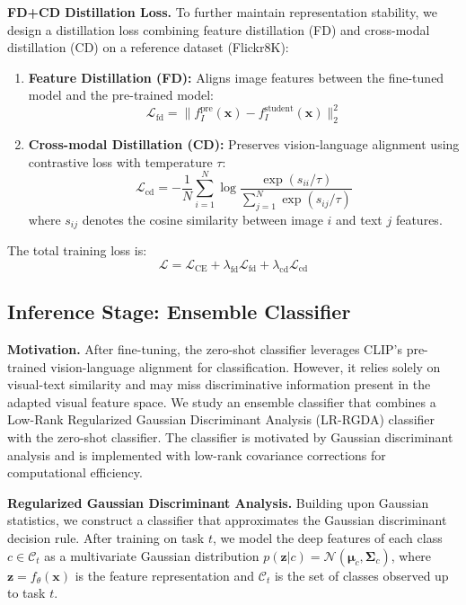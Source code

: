 \documentclass{article}
\begin{document}
\textbf{FD+CD Distillation Loss.}
To further maintain representation stability, we design a distillation loss combining feature distillation (FD) and cross-modal distillation (CD) on a reference dataset (Flickr8K):
\begin{enumerate}
    \item \textbf{Feature Distillation (FD):} Aligns image features between the fine-tuned model and the pre-trained model:
    \begin{equation}
        \mathcal{L}_{\text{fd}} = \|f_I^{\text{pre}}(\mathbf{x}) - f_I^{\text{student}}(\mathbf{x})\|_2^2
    \end{equation}
    \item \textbf{Cross-modal Distillation (CD):} Preserves vision-language alignment using contrastive loss with temperature $\tau$:
    \begin{equation}
        \mathcal{L}_{\text{cd}} = -\frac{1}{N}\sum_{i=1}^N \log \frac{\exp(s_{ii}/\tau)}{\sum_{j=1}^N \exp(s_{ij}/\tau)}
    \end{equation}
    where $s_{ij}$ denotes the cosine similarity between image $i$ and text $j$ features.
\end{enumerate}
The total training loss is:
\begin{equation}
    \mathcal{L} = \mathcal{L}_{\text{CE}} + \lambda_{\text{fd}} \mathcal{L}_{\text{fd}} + \lambda_{\text{cd}} \mathcal{L}_{\text{cd}}
\end{equation}

\subsection{Inference Stage: Ensemble Classifier}

\textbf{Motivation.}
After fine-tuning, the zero-shot classifier leverages CLIP's pre-trained vision-language alignment for classification. However, it relies solely on visual-text similarity and may miss discriminative information present in the adapted visual feature space. We study an ensemble classifier that combines a Low-Rank Regularized Gaussian Discriminant Analysis (LR-RGDA) classifier with the zero-shot classifier. The classifier is motivated by Gaussian discriminant analysis and is implemented with low-rank covariance corrections for computational efficiency.

\textbf{Regularized Gaussian Discriminant Analysis.}
Building upon Gaussian statistics, we construct a classifier that approximates the Gaussian discriminant decision rule. After training on task $t$, we model the deep features of each class $c \in \mathcal{C}_t$ as a multivariate Gaussian distribution $p(\mathbf{z}|c) = \mathcal{N}(\boldsymbol{\mu}_c, \mathbf{\Sigma}_c)$, where $\mathbf{z} = f_\theta(\mathbf{x})$ is the feature representation and $\mathcal{C}_t$ is the set of classes observed up to task $t$.
\end{document}
